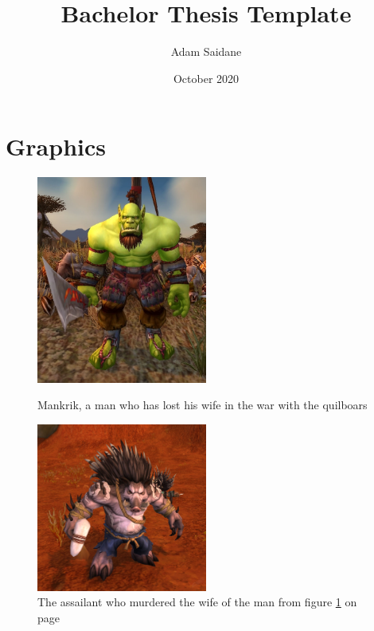 \documentclass{report}
\title{Bachelor Thesis Template}
\author{Adam Saidane}
\date{October 2020}
\begin{document}

\tableofcontents
\listoftodos
\section{Graphics}

\begin{figure}[ht]
	\caption{Mankrik, a  man who has lost his wife in the war with the quilboars}
	\includegraphics[width=0.5\textwidth]{mankrik}
	\label{mankrik}
\end{figure}

\begin{figure}[!ht]
	\centering
	\includegraphics[width=0.5\textwidth]{quilboar}
	\caption{The assailant who murdered the wife of the man from figure \ref{mankrik} on page \pageref{mankrik}}

\end{figure}
\end{document}
